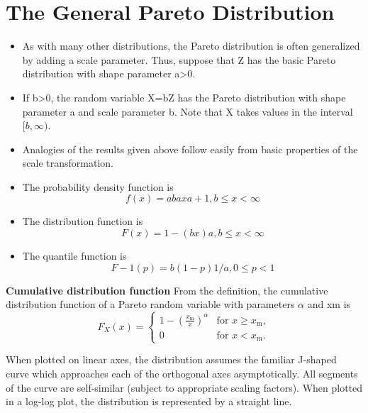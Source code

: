 \newpage
\section{The General Pareto Distribution}

\begin{itemize}
\item As with many other distributions, the Pareto distribution is often generalized by adding a scale parameter. Thus, suppose that Z has the basic Pareto distribution with shape parameter a>0.
\item If b>0, the random variable X=bZ has the Pareto distribution with shape parameter a and scale parameter b. Note that X takes values in the interval $[b, \infty)$.

\item Analogies of the results given above follow easily from basic properties of the scale transformation.

\end{itemize}



\begin{itemize}
\item The probability density function is
\[ f(x)=abaxa+1,b\leq x< \infty \]
\item The distribution function is
\[F(x)=1-(bx)a,b\leq x< \infty \]


\item The quantile function is
\[F-1(p)=b(1-p)1/a,0\leq p<1\]
\end{itemize}


\noindent \textbf{Cumulative distribution function}
From the definition, the cumulative distribution function of a Pareto random variable with parameters $\alpha$ and xm is
\[F_X(x) = \begin{cases}
1-\left(\frac{x_\mathrm{m}}{x}\right)^\alpha & \mbox{for } x \ge x_\mathrm{m}, \\
0 & \mbox{for }x < x_\mathrm{m}.
\end{cases}
\]


When plotted on linear axes, the distribution assumes the familiar J-shaped curve which approaches each of the orthogonal axes asymptotically. All segments of the curve are self-similar (subject to appropriate scaling factors). When plotted in a log-log plot, the distribution is represented by a straight line.
